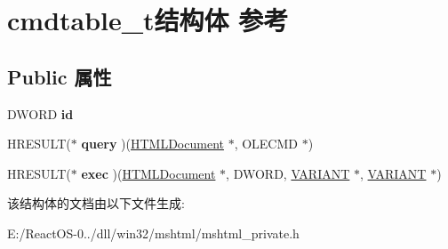 \hypertarget{structcmdtable__t}{}\section{cmdtable\+\_\+t结构体 参考}
\label{structcmdtable__t}
\subsection*{Public 属性}
\begin{DoxyCompactItemize}
\item 
\mbox{\label{structcmdtable__t_a16fa7e758cf3ea76e0a05ebcf9eb2ca4}} 
D\+W\+O\+RD {\bfseries id}
\item 
\mbox{\label{structcmdtable__t_ac4bb9325ba90943cea88359eef02a71d}} 
H\+R\+E\+S\+U\+LT($\ast$ {\bfseries query} )(\hyperlink{struct_h_t_m_l_document}{H\+T\+M\+L\+Document} $\ast$, O\+L\+E\+C\+MD $\ast$)
\item 
\mbox{\label{structcmdtable__t_a48179072db7cf26f58c7743641a07e98}} 
H\+R\+E\+S\+U\+LT($\ast$ {\bfseries exec} )(\hyperlink{struct_h_t_m_l_document}{H\+T\+M\+L\+Document} $\ast$, D\+W\+O\+RD, \hyperlink{structtag_v_a_r_i_a_n_t}{V\+A\+R\+I\+A\+NT} $\ast$, \hyperlink{structtag_v_a_r_i_a_n_t}{V\+A\+R\+I\+A\+NT} $\ast$)
\end{DoxyCompactItemize}


该结构体的文档由以下文件生成\+:\begin{DoxyCompactItemize}
\item 
E\+:/\+React\+O\+S-\/0../dll/win32/mshtml/mshtml\+\_\+private.\+h\end{DoxyCompactItemize}
